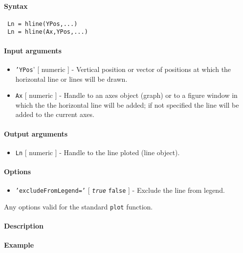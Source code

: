 


	\paragraph{Syntax}
 
 \begin{verbatim}
 Ln = hline(YPos,...)
 Ln = hline(Ax,YPos,...)
 \end{verbatim}
 
 \paragraph{Input arguments}
 
 \begin{itemize}
 \item
   \texttt{'YPos}' {[} numeric {]} - Vertical position or vector of
   positions at which the horizontal line or lines will be drawn.
 \item
   \texttt{Ax} {[} numeric {]} - Handle to an axes object (graph) or to a
   figure window in which the the horizontal line will be added; if not
   specified the line will be added to the current axes.
 \end{itemize}
 
 \paragraph{Output arguments}
 
 \begin{itemize}
 \item
   \texttt{Ln} {[} numeric {]} - Handle to the line ploted (line object).
 \end{itemize}
 
 \paragraph{Options}
 
 \begin{itemize}
 \item
   \texttt{'excludeFromLegend='} {[} \emph{\texttt{true}} \textbar{}
   \texttt{false} {]} - Exclude the line from legend.
 \end{itemize}
 
 Any options valid for the standard \texttt{plot} function.
 
 \paragraph{Description}
 
 \paragraph{Example}


